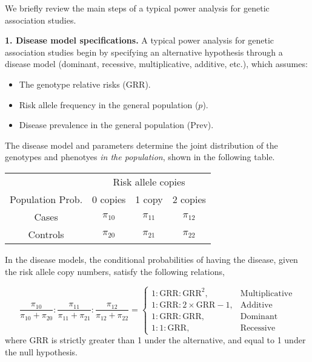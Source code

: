 We briefly review the main steps of a typical power analysis for genetic association studies.

\medskip
{\bf 1. Disease model specifications.}
A typical power analysis for genetic association studies begin by specifying an alternative hypothesis through a disease model (dominant, recessive, multiplicative, additive, etc.), which assumes:

\begin{itemize}
    \item The genotype relative risks (GRR).
    \item Risk allele frequency in the general population ($p$).
    \item Disease prevalence in the general population (Prev).
\end{itemize}

The disease model and parameters determine the joint distribution of the genotypes and phenotyes {\it in the population}, shown in the following table.

\begin{center}
    \begin{tabular}{cccc}
    \hline
    & \multicolumn{3}{c}{Risk allele copies} \\
    \cline{2-4}
    Population Prob. & 0 copies & 1 copy & 2 copies \\
    \hline
    Cases & $\pi_{10}$ & $\pi_{11}$ & $\pi_{12}$ \\
    Controls & $\pi_{20}$ & $\pi_{21}$ & $\pi_{22}$ \\
    \hline
    \end{tabular}
\end{center}

In the disease models, the conditional probabilities of having the disease, given the risk allele copy numbers, satisfy the following relations,

\begin{equation} \label{eq:GRR}
    \frac{\pi_{10}}{\pi_{10} + \pi_{20}} : \frac{\pi_{11}}{\pi_{11} + \pi_{21}} : \frac{\pi_{12}}{\pi_{12} + \pi_{22}}
    = \begin{cases}
    1 : \text{GRR} : \text{GRR}^2, &\text{Multiplicative} \\
    1 : \text{GRR} : 2\times\text{GRR}-1, & \text{Additive} \\
    1 : \text{GRR} : \text{GRR}, & \text{Dominant} \\
    1 : 1 : \text{GRR}, & \text{Recessive}
\end{cases}
\end{equation}
where GRR is strictly greater than 1 under the alternative, and equal to 1 under the null hypothesis.

